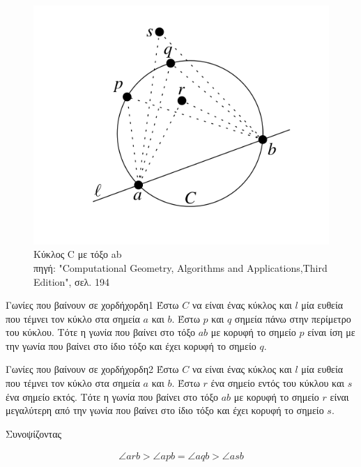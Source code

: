 \documentclass[oneside,12pt]{book}
\newenvironment{matlab}
	{\begin{figure}[hp]\centering\captionsetup{justification=centering}}
	{\end{figure}}
\theoremstyle{definition}
\begin{document}
\begin{matlab}
	\includegraphics[scale=0.4]{images/circle.png}
	\caption{Κύκλος C με τόξο ab \\ πηγή: "Computational Geometry, Algorithms and Applications,Third Edition", σελ. 194}
\end{matlab}

\begin{mytheorem}{Γωνίες που βαίνουν σε χορδή}{χορδη1}
	Έστω \(C\) να είναι ένας κύκλος και \(l\) μία ευθεία που τέμνει τον κύκλο στα σημεία \(a\) και \(b\). Έστω \(p\) και \(q\) σημεία πάνω στην περίμετρο του κύκλου. Τότε η γωνία που βαίνει στο τόξο \(ab\) με κορυφή το σημείο \(p\) είναι ίση με την γωνία που βαίνει στο ίδιο τόξο και έχει κορυφή το σημείο \(q\). 
\end{mytheorem}

\begin{mytheorem}{Γωνίες που βαίνουν σε χορδή}{χορδη2}
	Έστω \(C\) να είναι ένας κύκλος και \(l\) μία ευθεία που τέμνει τον κύκλο στα σημεία \(a\) και \(b\). Έστω \(r\) ένα σημείο εντός του κύκλου και \(s\) ένα σημείο εκτός. Τότε η γωνία που βαίνει στο τόξο \(ab\) με κορυφή το σημείο \(r\) είναι μεγαλύτερη από την γωνία που βαίνει στο ίδιο τόξο και έχει κορυφή το σημείο \(s\). 
\end{mytheorem}

Συνοψίζοντας 

\begin{align}
	\angle arb > \angle apb = \angle aqb > \angle asb
\end{align}
\end{document}
